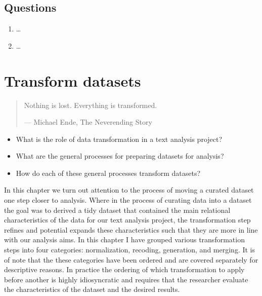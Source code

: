 \documentclass[
  letterpaper,
]{latex/krantz}
\providecommand{\tightlist}{%
  \setlength{\itemsep}{0pt}\setlength{\parskip}{0pt}}\usepackage{longtable,booktabs,array}
\begin{document}
\hypertarget{questions-5}{%
\section*{Questions}\label{questions-5}}


\begin{enumerate}
\def\labelenumi{\arabic{enumi}.}
\tightlist
\item
  \ldots{}
\item
  \ldots{}
\end{enumerate}

\hypertarget{sec-transform-datasets}{%
\chapter{Transform datasets}\label{sec-transform-datasets}}

\begin{quote}
Nothing is lost. Everything is transformed.

--- Michael Ende, The Neverending Story
\end{quote}

\begin{tcolorbox}[enhanced jigsaw, toprule=.15mm, bottomtitle=1mm, coltitle=black, title=\textcolor{quarto-callout-note-color}{\faInfo}\hspace{0.5em}{Keys}, left=2mm, colframe=quarto-callout-note-color-frame, bottomrule=.15mm, colbacktitle=quarto-callout-note-color!10!white, leftrule=.75mm, colback=white, titlerule=0mm, breakable, toptitle=1mm, opacityback=0, arc=.35mm, rightrule=.15mm, opacitybacktitle=0.6]

\begin{itemize}
\tightlist
\item
  What is the role of data transformation in a text analysis project?
\item
  What are the general processes for preparing datasets for analysis?
\item
  How do each of these general processes transform datasets?
\end{itemize}

\end{tcolorbox}

In this chapter we turn out attention to the process of moving a curated
dataset one step closer to analysis. Where in the process of curating
data into a dataset the goal was to derived a tidy dataset that
contained the main relational characteristics of the data for our text
analysis project, the transformation step refines and potential expands
these characteristics such that they are more in line with our analysis
aims. In this chapter I have grouped various transformation steps into
four categories: normalization, recoding, generation, and merging. It is
of note that the these categories have been ordered and are covered
separately for descriptive reasons. In practice the ordering of which
transformation to apply before another is highly idiosyncratic and
requires that the researcher evaluate the characteristics of the dataset
and the desired results.
\end{document}
